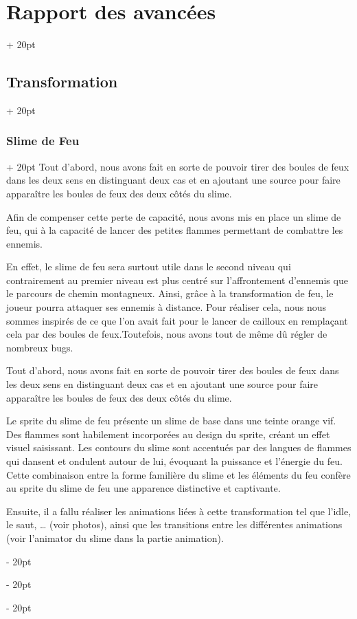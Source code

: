 \documentclass[a4paper, 12pt, twoside]{article}
\newcommand{\ind}[1][20pt]{\advance\leftskip + #1}
\newcommand{\deind}[1][20pt]{\advance\leftskip - #1}
\newenvironment{indt}[2][20pt]{#2 \par \ind[#1]}{\par \deind} %
\begin{document}
\begin{indt}{\section{Rapport des avancées}}
\begin{indt}{\subsection{Transformation}}
\begin{indt}{\subsubsection{Slime de Feu}}
                Tout d’abord, nous avons fait en sorte de pouvoir tirer des boules de feux dans les deux sens en distinguant deux cas et en ajoutant une source pour faire apparaître les boules de feux des deux côtés du slime.

                Afin de compenser cette perte de capacité, nous avons mis en place un slime de feu, qui à la capacité de lancer des petites flammes permettant de combattre les ennemis.

                En effet, le slime de feu sera surtout utile dans le second niveau qui contrairement au premier niveau est plus centré sur l’affrontement d’ennemis que le parcours de chemin montagneux. Ainsi, grâce à la transformation de feu, le joueur pourra attaquer ses ennemis à distance. Pour réaliser cela, nous nous sommes inspirés de ce que l’on avait fait pour le lancer de cailloux en remplaçant cela par des boules de feux.Toutefois, nous avons tout de même dû régler de nombreux bugs.

                Tout d’abord, nous avons fait en sorte de pouvoir tirer des boules de feux dans les deux sens en distinguant deux cas et en ajoutant une source pour faire apparaître les boules de feux des deux côtés du slime.

                Le sprite du slime de feu présente un slime de base dans une teinte orange vif. Des flammes sont habilement incorporées au design du sprite, créant un effet visuel saisissant. Les contours du slime sont accentués par des langues de flammes qui dansent et ondulent autour de lui, évoquant la puissance et l'énergie du feu. Cette combinaison entre la forme familière du slime et les éléments du feu confère au sprite du slime de feu une apparence distinctive et captivante.

                Ensuite, il a fallu réaliser les animations liées à cette transformation tel que l’idle, le saut, … (voir photos), ainsi que les transitions entre les différentes animations (voir l’animator du slime dans la partie animation).
            \end{indt}
        \end{indt}

        \newpage


\end{indt}
\end{document}
